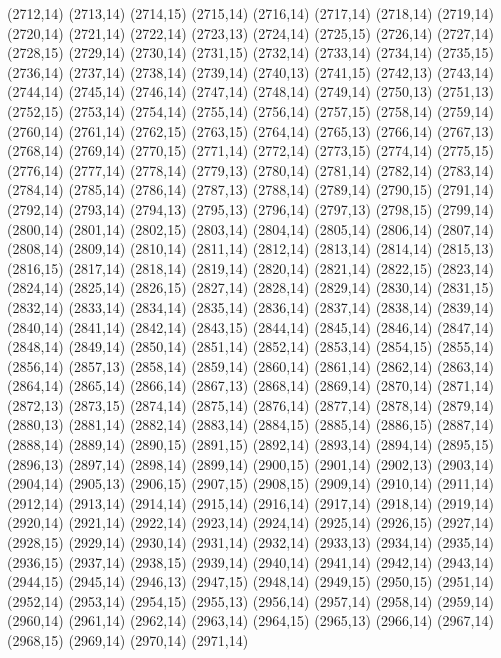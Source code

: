 (2712,14)
(2713,14)
(2714,15)
(2715,14)
(2716,14)
(2717,14)
(2718,14)
(2719,14)
(2720,14)
(2721,14)
(2722,14)
(2723,13)
(2724,14)
(2725,15)
(2726,14)
(2727,14)
(2728,15)
(2729,14)
(2730,14)
(2731,15)
(2732,14)
(2733,14)
(2734,14)
(2735,15)
(2736,14)
(2737,14)
(2738,14)
(2739,14)
(2740,13)
(2741,15)
(2742,13)
(2743,14)
(2744,14)
(2745,14)
(2746,14)
(2747,14)
(2748,14)
(2749,14)
(2750,13)
(2751,13)
(2752,15)
(2753,14)
(2754,14)
(2755,14)
(2756,14)
(2757,15)
(2758,14)
(2759,14)
(2760,14)
(2761,14)
(2762,15)
(2763,15)
(2764,14)
(2765,13)
(2766,14)
(2767,13)
(2768,14)
(2769,14)
(2770,15)
(2771,14)
(2772,14)
(2773,15)
(2774,14)
(2775,15)
(2776,14)
(2777,14)
(2778,14)
(2779,13)
(2780,14)
(2781,14)
(2782,14)
(2783,14)
(2784,14)
(2785,14)
(2786,14)
(2787,13)
(2788,14)
(2789,14)
(2790,15)
(2791,14)
(2792,14)
(2793,14)
(2794,13)
(2795,13)
(2796,14)
(2797,13)
(2798,15)
(2799,14)
(2800,14)
(2801,14)
(2802,15)
(2803,14)
(2804,14)
(2805,14)
(2806,14)
(2807,14)
(2808,14)
(2809,14)
(2810,14)
(2811,14)
(2812,14)
(2813,14)
(2814,14)
(2815,13)
(2816,15)
(2817,14)
(2818,14)
(2819,14)
(2820,14)
(2821,14)
(2822,15)
(2823,14)
(2824,14)
(2825,14)
(2826,15)
(2827,14)
(2828,14)
(2829,14)
(2830,14)
(2831,15)
(2832,14)
(2833,14)
(2834,14)
(2835,14)
(2836,14)
(2837,14)
(2838,14)
(2839,14)
(2840,14)
(2841,14)
(2842,14)
(2843,15)
(2844,14)
(2845,14)
(2846,14)
(2847,14)
(2848,14)
(2849,14)
(2850,14)
(2851,14)
(2852,14)
(2853,14)
(2854,15)
(2855,14)
(2856,14)
(2857,13)
(2858,14)
(2859,14)
(2860,14)
(2861,14)
(2862,14)
(2863,14)
(2864,14)
(2865,14)
(2866,14)
(2867,13)
(2868,14)
(2869,14)
(2870,14)
(2871,14)
(2872,13)
(2873,15)
(2874,14)
(2875,14)
(2876,14)
(2877,14)
(2878,14)
(2879,14)
(2880,13)
(2881,14)
(2882,14)
(2883,14)
(2884,15)
(2885,14)
(2886,15)
(2887,14)
(2888,14)
(2889,14)
(2890,15)
(2891,15)
(2892,14)
(2893,14)
(2894,14)
(2895,15)
(2896,13)
(2897,14)
(2898,14)
(2899,14)
(2900,15)
(2901,14)
(2902,13)
(2903,14)
(2904,14)
(2905,13)
(2906,15)
(2907,15)
(2908,15)
(2909,14)
(2910,14)
(2911,14)
(2912,14)
(2913,14)
(2914,14)
(2915,14)
(2916,14)
(2917,14)
(2918,14)
(2919,14)
(2920,14)
(2921,14)
(2922,14)
(2923,14)
(2924,14)
(2925,14)
(2926,15)
(2927,14)
(2928,15)
(2929,14)
(2930,14)
(2931,14)
(2932,14)
(2933,13)
(2934,14)
(2935,14)
(2936,15)
(2937,14)
(2938,15)
(2939,14)
(2940,14)
(2941,14)
(2942,14)
(2943,14)
(2944,15)
(2945,14)
(2946,13)
(2947,15)
(2948,14)
(2949,15)
(2950,15)
(2951,14)
(2952,14)
(2953,14)
(2954,15)
(2955,13)
(2956,14)
(2957,14)
(2958,14)
(2959,14)
(2960,14)
(2961,14)
(2962,14)
(2963,14)
(2964,15)
(2965,13)
(2966,14)
(2967,14)
(2968,15)
(2969,14)
(2970,14)
(2971,14)
